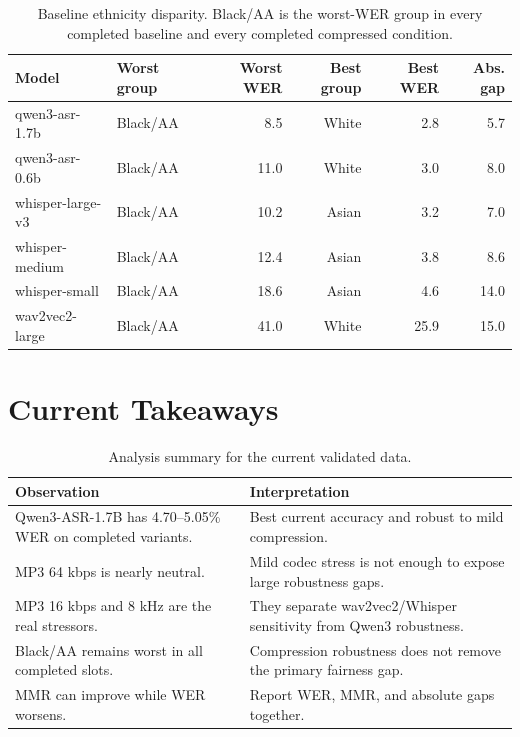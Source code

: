 \documentclass[11pt]{article}
\begin{document}
\begin{table}[t]
\centering
\scriptsize
\begin{tabular}{@{}llrrrr@{}}
\toprule
Model & Worst group & Worst WER & Best group & Best WER & Abs. gap \\
\midrule
qwen3-asr-1.7b & Black/AA & 8.5 & White & 2.8 & 5.7 \\
qwen3-asr-0.6b & Black/AA & 11.0 & White & 3.0 & 8.0 \\
whisper-large-v3 & Black/AA & 10.2 & Asian & 3.2 & 7.0 \\
whisper-medium & Black/AA & 12.4 & Asian & 3.8 & 8.6 \\
whisper-small & Black/AA & 18.6 & Asian & 4.6 & 14.0 \\
wav2vec2-large & Black/AA & 41.0 & White & 25.9 & 15.0 \\
\bottomrule
\end{tabular}
\caption{Baseline ethnicity disparity. Black/AA is the worst-WER group in every completed baseline and every completed compressed condition.}
\label{tab:groups}
\end{table}

\section{Current Takeaways}

\begin{table}[t]
\centering
\scriptsize
\begin{tabular}{@{}p{}p{}@{}}
\toprule
Observation & Interpretation \\
\midrule
Qwen3-ASR-1.7B has 4.70--5.05\% WER on completed variants. & Best current accuracy and robust to mild compression. \\
MP3 64 kbps is nearly neutral. & Mild codec stress is not enough to expose large robustness gaps. \\
MP3 16 kbps and 8 kHz are the real stressors. & They separate wav2vec2/Whisper sensitivity from Qwen3 robustness. \\
Black/AA remains worst in all completed slots. & Compression robustness does not remove the primary fairness gap. \\
MMR can improve while WER worsens. & Report WER, MMR, and absolute gaps together. \\
\bottomrule
\end{tabular}
\caption{Analysis summary for the current validated data.}
\label{tab:takeaways}
\end{table}
\end{document}
